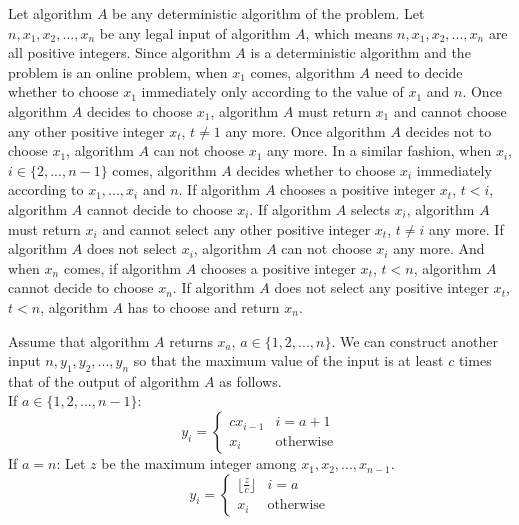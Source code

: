 Let algorithm $A$ be any deterministic algorithm of the problem.
Let $n, x_1,x_2,...,x_n$ be any legal input of algorithm $A$, which means $n, x_1, x_2,..., x_n$ are all positive integers.
Since algorithm $A$ is a deterministic algorithm and the problem is an online problem, 
when $x_1$ comes, 
algorithm $A$ need to decide whether to choose $x_1$ immediately only according to the value of $x_1$ and $n$.
Once algorithm $A$ decides to choose $x_1$, algorithm $A$ must return $x_1$ and cannot choose any other positive integer $x_t$, $t\neq 1$ any more.
Once algorithm $A$ decides not to choose $x_1$, algorithm $A$ can not choose $x_1$ any more.
In a similar fashion, when $x_i$, $i\in \{2,...,n-1\}$ comes, algorithm $A$ decides whether to choose $x_i$ immediately according to $x_1,...,x_i$ and $n$.
If algorithm $A$ chooses a positive integer $x_t$, $t<i$, algorithm $A$ cannot decide to choose $x_i$.
If algorithm $A$ selects $x_i$, algorithm $A$ must return $x_i$ and cannot select any other positive integer $x_t$, $t\neq i$ any more.
If algorithm $A$ does not select $x_i$, algorithm $A$ can not choose $x_i$ any more.
And when $x_n$ comes, if algorithm $A$ chooses a positive integer $x_t$, $t<n$, algorithm $A$ cannot decide to choose $x_n$.
If algorithm $A$ does not select any positive integer $x_t$, $t<n$, algorithm $A$ has to choose and return $x_n$.

Assume that algorithm $A$ returns $x_a$, $a\in \{1,2,...,n\}$.
We can construct another input $n, y_1,y_2,...,y_n$ so that the maximum value of the input is at least $c$ times that of the output of algorithm $A$ as follows.\\
If $a\in \{1,2,...,n-1\}$:
\begin{equation}
    \nonumber  y_i=
     \begin{cases}
     cx_{i-1}& i=a+1\\
     x_i& \text{otherwise}
     \end{cases}
 \end{equation}
If $a=n$:
Let $z$ be the maximum integer among $x_1,x_2,...,x_{n-1}$.
\begin{equation}
    \nonumber  y_i=
     \begin{cases}
        \lfloor \frac{z}{c}\rfloor& i=a\\
     x_i& \text{otherwise}
     \end{cases}
 \end{equation}

